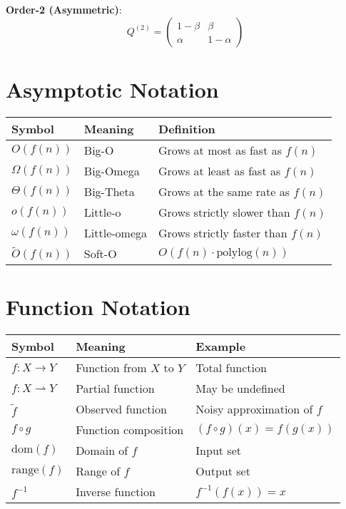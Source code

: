 \textbf{Order-2 (Asymmetric)}:
\begin{equation}
Q^{(2)} = \begin{pmatrix}
1-\beta & \beta \\
\alpha & 1-\alpha
\end{pmatrix}
\end{equation}

\section{Asymptotic Notation}

\begin{tabular}{|l|l|l|}
\hline
\textbf{Symbol} & \textbf{Meaning} & \textbf{Definition} \\
\hline
$O(f(n))$ & Big-O & Grows at most as fast as $f(n)$ \\
$\Omega(f(n))$ & Big-Omega & Grows at least as fast as $f(n)$ \\
$\Theta(f(n))$ & Big-Theta & Grows at the same rate as $f(n)$ \\
$o(f(n))$ & Little-o & Grows strictly slower than $f(n)$ \\
$\omega(f(n))$ & Little-omega & Grows strictly faster than $f(n)$ \\
$\tilde{O}(f(n))$ & Soft-O & $O(f(n) \cdot \text{polylog}(n))$ \\
\hline
\end{tabular}

\section{Function Notation}

\begin{tabular}{|l|l|l|}
\hline
\textbf{Symbol} & \textbf{Meaning} & \textbf{Example} \\
\hline
$f: X \to Y$ & Function from $X$ to $Y$ & Total function \\
$f: X \rightharpoonup Y$ & Partial function & May be undefined \\
$\tilde{f}$ & Observed function & Noisy approximation of $f$ \\
$f \circ g$ & Function composition & $(f \circ g)(x) = f(g(x))$ \\
$\text{dom}(f)$ & Domain of $f$ & Input set \\
$\text{range}(f)$ & Range of $f$ & Output set \\
$f^{-1}$ & Inverse function & $f^{-1}(f(x)) = x$ \\
\hline
\end{tabular}

